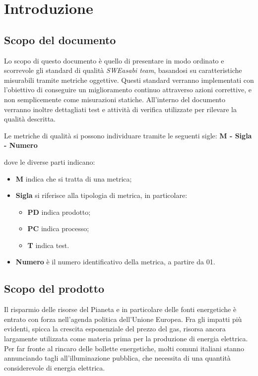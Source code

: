 \chapter{Introduzione}
\section{Scopo del documento}
Lo scopo di questo documento è quello di presentare in modo ordinato e scorrevole gli standard di qualità \textit{SWEasabi team}, basandosi su caratteristiche misurabili tramite metriche oggettive. Questi standard verranno implementati con l'obiettivo di conseguire un miglioramento continuo attraverso azioni correttive, e non semplicemente come misurazioni statiche. All'interno del documento verranno inoltre dettagliati test e attività di verifica utilizzate per rilevare la qualità descritta.

Le metriche di qualità si possono individuare tramite le seguenti sigle: \textbf{M - Sigla - Numero}

dove le diverse parti indicano:

\begin{itemize}
    \item \textbf{M} indica che si tratta di una metrica;
    \item \textbf{Sigla} si riferisce alla tipologia di metrica, in particolare:
    \begin{itemize}
        \item \textbf{PD} indica prodotto;
        \item \textbf{PC} indica processo;
        \item \textbf{T} indica test.
    \end{itemize}
    \item \textbf{Numero} è il numero identificativo della metrica, a partire da 01.
\end{itemize}

\section{Scopo del prodotto}
Il risparmio delle risorse del Pianeta e in particolare delle fonti energetiche è entrato con forza nell'agenda politica dell'Unione Europea. Fra gli impatti più evidenti, spicca la crescita esponenziale del prezzo del gas, risorsa ancora largamente utilizzata come materia prima per la produzione di energia elettrica.
Per far fronte al rincaro delle bollette energetiche, molti comuni italiani stanno annunciando tagli all'illuminazione pubblica, che necessita di una quantità considerevole di energia elettrica.

